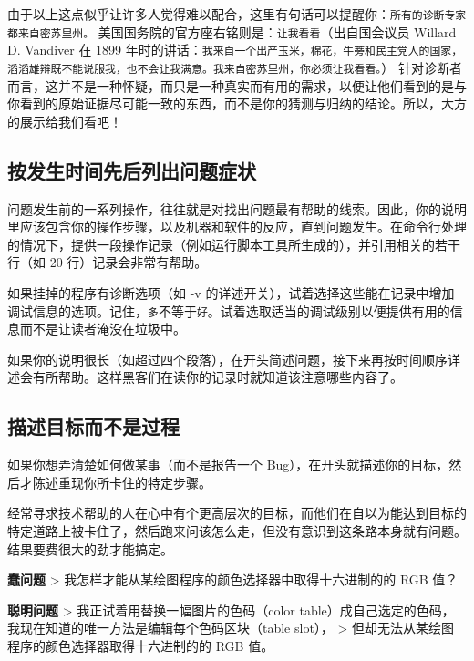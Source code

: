 \documentclass[titlepage]{article}
\begin{document}
由于以上这点似乎让许多人觉得难以配合，这里有句话可以提醒你：\texttt{所有的诊断专家都来自密苏里州。}
美国国务院的官方座右铭则是：\texttt{让我看看}（出自国会议员 Willard D.
Vandiver 在 1899
年时的讲话：\texttt{我来自一个出产玉米，棉花，牛蒡和民主党人的国家，滔滔雄辩既不能说服我，也不会让我满意。我来自密苏里州，你必须让我看看。}）
针对诊断者而言，这并不是一种怀疑，而只是一种真实而有用的需求，以便让他们看到的是与你看到的原始证据尽可能一致的东西，而不是你的猜测与归纳的结论。所以，大方的展示给我们看吧！

\hypertarget{ux6309ux53d1ux751fux65f6ux95f4ux5148ux540eux5217ux51faux95eeux9898ux75c7ux72b6}{\subsection{按发生时间先后列出问题症状}\label{ux6309ux53d1ux751fux65f6ux95f4ux5148ux540eux5217ux51faux95eeux9898ux75c7ux72b6}}

问题发生前的一系列操作，往往就是对找出问题最有帮助的线索。因此，你的说明里应该包含你的操作步骤，以及机器和软件的反应，直到问题发生。在命令行处理的情况下，提供一段操作记录（例如运行脚本工具所生成的），并引用相关的若干行（如
20 行）记录会非常有帮助。

如果挂掉的程序有诊断选项（如 -v
的详述开关），试着选择这些能在记录中增加调试信息的选项。记住，\texttt{多}不等于\texttt{好}。试着选取适当的调试级别以便提供有用的信息而不是让读者淹没在垃圾中。

如果你的说明很长（如超过四个段落），在开头简述问题，接下来再按时间顺序详述会有所帮助。这样黑客们在读你的记录时就知道该注意哪些内容了。

\hypertarget{ux63cfux8ff0ux76eeux6807ux800cux4e0dux662fux8fc7ux7a0b}{\subsection{描述目标而不是过程}\label{ux63cfux8ff0ux76eeux6807ux800cux4e0dux662fux8fc7ux7a0b}}

如果你想弄清楚如何做某事（而不是报告一个
Bug），在开头就描述你的目标，然后才陈述重现你所卡住的特定步骤。

经常寻求技术帮助的人在心中有个更高层次的目标，而他们在自以为能达到目标的特定道路上被卡住了，然后跑来问该怎么走，但没有意识到这条路本身就有问题。结果要费很大的劲才能搞定。

\textbf{蠢问题} \textgreater{}
我怎样才能从某绘图程序的颜色选择器中取得十六进制的的 RGB 值？

\textbf{聪明问题} \textgreater{} 我正试着用替换一幅图片的色码（color
table）成自己选定的色码，我现在知道的唯一方法是编辑每个色码区块（table
slot）， \textgreater{} 但却无法从某绘图程序的颜色选择器取得十六进制的的
RGB 值。
\end{document}
